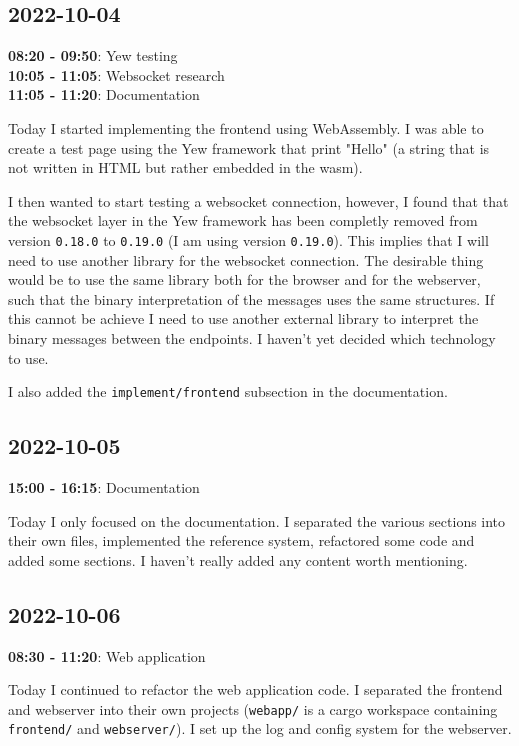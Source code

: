 \documentclass{article}
\begin{document}
\subsection{2022-10-04}

\textbf{08:20 - 09:50}: Yew testing \\
\textbf{10:05 - 11:05}: Websocket research \\
\textbf{11:05 - 11:20}: Documentation

Today I started implementing the frontend using WebAssembly.
I was able to create a test page using the Yew framework that print "Hello"
(a string that is not written in HTML but rather embedded in the wasm).

I then wanted to start testing a websocket connection, however, I found that that the
websocket layer in the Yew framework has been completly removed from version \texttt{0.18.0}
to \texttt{0.19.0} (I am using version \texttt{0.19.0}). This implies that I will need to use
another library for the websocket connection.
The desirable thing would be to use the same library both
for the browser and for the webserver, such that the binary
interpretation of the messages uses the same structures.
If this cannot be achieve I need to use another external library
to interpret the binary messages between the endpoints.
I haven't yet decided which technology to use.

I also added the \texttt{implement/frontend} subsection in the documentation.

\subsection{2022-10-05}

\textbf{15:00 - 16:15}: Documentation

Today I only focused on the documentation.
I separated the various sections into their own files,
implemented the reference system, refactored some code
and added some sections.
I haven't really added any content worth mentioning.

\subsection{2022-10-06}

\textbf{08:30 - 11:20}: Web application

Today I continued to refactor the web application code. I separated
the frontend and webserver into their own projects (\texttt{webapp/} is a cargo workspace containing
\texttt{frontend/} and \texttt{webserver/}). I set up the log and config system for the webserver.
\end{document}
